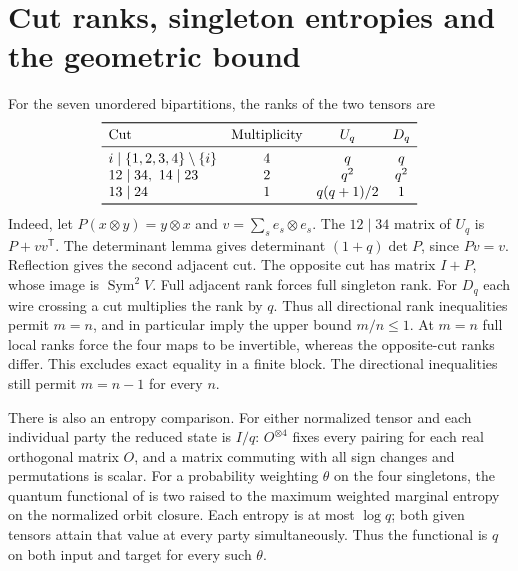 \documentclass[11pt]{article}
\begin{document}
\section{Cut ranks, singleton entropies and the geometric bound}

For the seven unordered bipartitions, the ranks of the two tensors are
\[
\begin{array}{lccc}
\toprule
\text{Cut} & \text{Multiplicity} & U_q & D_q\\
\midrule
 i\mid\{1,2,3,4\}\setminus\{i\} &4 &q&q\\
 12\mid34,\ 14\mid23 &2&q^2&q^2\\
 13\mid24 &1&q(q+1)/2&1\\
\bottomrule
\end{array}
\]
Indeed, let \(P(x\otimes y)=y\otimes x\) and \(v=\sum_s e_s\otimes e_s\).
The \(12\mid34\) matrix of \(U_q\) is \(P+vv^{\mathsf T}\).
The determinant lemma gives determinant \((1+q)\det P\), since \(Pv=v\).
Reflection gives the second adjacent cut. The opposite cut has matrix
\(I+P\), whose image is \(\operatorname{Sym}^2 V\). Full adjacent rank
forces full singleton rank. For \(D_q\) each wire crossing a cut multiplies
the rank by \(q\). Thus all directional rank inequalities permit \(m=n\),
and in particular imply the upper bound \(m/n\le1\).
At \(m=n\) full local ranks force the four maps to be invertible, whereas the
opposite-cut ranks differ. This excludes exact equality in a finite block.
The directional inequalities still permit \(m=n-1\) for every \(n\).

There is also an entropy comparison. For either normalized tensor and each
individual party the reduced state is \(I/q\): \(O^{\otimes4}\) fixes
every pairing for each real orthogonal matrix \(O\), and a matrix commuting
with all sign changes and permutations is scalar. For a probability
weighting \(\theta\) on the four singletons, the quantum functional of
\cite{cvz} is two raised to the maximum weighted marginal entropy on
the normalized orbit closure. Each entropy is at most \(\log q\); both
given tensors attain that value at every party simultaneously. Thus the
functional is \(q\) on both input and target for every such \(\theta\).
\end{document}
